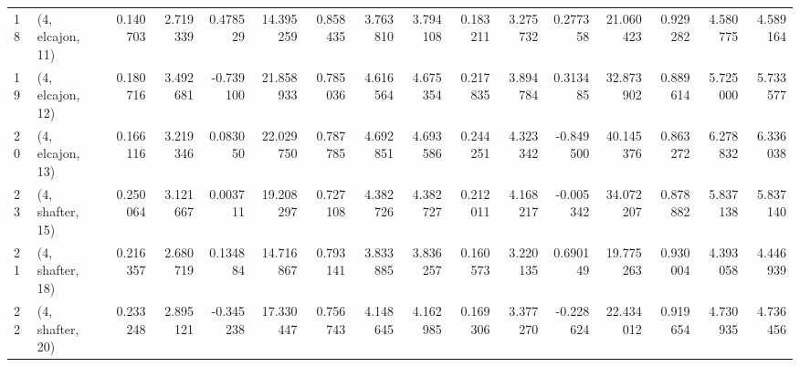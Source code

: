 \begin{tabular}{llrrrrrrrrrrrrrr}
18 &  (4, elcajon, 11) &   0.140703 &  2.719339 &  0.478529 &  14.395259 &  0.858435 &   3.763810 &  3.794108 &  0.183211 &  3.275732 &  0.277358 &   21.060423 &  0.929282 &   4.580775 &   4.589164 \\
19 &  (4, elcajon, 12) &   0.180716 &  3.492681 & -0.739100 &  21.858933 &  0.785036 &   4.616564 &  4.675354 &  0.217835 &  3.894784 &  0.313485 &   32.873902 &  0.889614 &   5.725000 &   5.733577 \\
20 &  (4, elcajon, 13) &   0.166116 &  3.219346 &  0.083050 &  22.029750 &  0.787785 &   4.692851 &  4.693586 &  0.244251 &  4.323342 & -0.849500 &   40.145376 &  0.863272 &   6.278832 &   6.336038 \\
23 &  (4, shafter, 15) &   0.250064 &  3.121667 &  0.003711 &  19.208297 &  0.727108 &   4.382726 &  4.382727 &  0.212011 &  4.168217 & -0.005342 &   34.072207 &  0.878882 &   5.837138 &   5.837140 \\
21 &  (4, shafter, 18) &   0.216357 &  2.680719 &  0.134884 &  14.716867 &  0.793141 &   3.833885 &  3.836257 &  0.160573 &  3.220135 &  0.690149 &   19.775263 &  0.930004 &   4.393058 &   4.446939 \\
22 &  (4, shafter, 20) &   0.233248 &  2.895121 & -0.345238 &  17.330447 &  0.756743 &   4.148645 &  4.162985 &  0.169306 &  3.377270 & -0.228624 &   22.434012 &  0.919654 &   4.730935 &   4.736456 \\
\bottomrule
\end{tabular}
